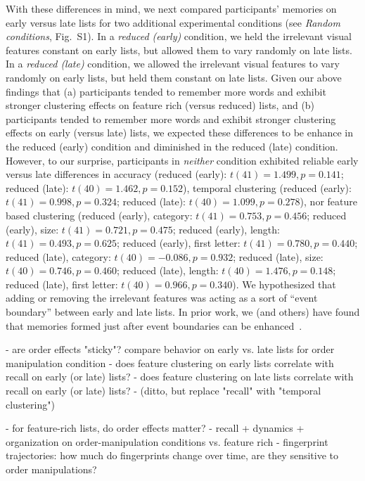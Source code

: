 \documentclass[11pt]{article}
\newcommand{\dynamicsRandom}{S1}
\begin{document}
With these differences in mind, we next compared participants' memories on
early versus late lists for two additional experimental conditions (see
\textit{Random conditions}, Fig.~\dynamicsRandom). In a \textit{reduced
(early)} condition, we held the irrelevant visual features constant on early
lists, but allowed them to vary randomly on late lists. In a \textit{reduced
(late)} condition, we allowed the irrelevant visual features to vary randomly
on early lists, but held them constant on late lists. Given our above findings
that (a) participants tended to remember more words and exhibit stronger
clustering effects on feature rich (versus reduced) lists, and (b) participants
tended to remember more words and exhibit stronger clustering effects on early
(versus late) lists, we expected these differences to be enhance in the reduced
(early) condition and diminished in the reduced (late) condition. However, to
our surprise, participants in \textit{neither} condition exhibited reliable
early versus late differences in accuracy (reduced (early): $t(41) = 1.499, p =
0.141$; reduced (late): $t(40) = 1.462, p = 0.152$), temporal clustering
(reduced (early): $t(41) = 0.998, p = 0.324$; reduced (late): $t(40) = 1.099, p
= 0.278$), nor feature based clustering (reduced (early), category: $t(41) =
0.753, p = 0.456$; reduced (early), size: $t(41) = 0.721, p = 0.475$; reduced
(early), length: $t(41) = 0.493, p = 0.625$; reduced (early), first letter:
$t(41) = 0.780, p = 0.440$; reduced (late), category: $t(40) = -0.086, p =
0.932$; reduced (late), size: $t(40) = 0.746, p = 0.460$; reduced (late),
length: $t(40) = 1.476, p = 0.148$; reduced (late), first letter: $t(40) =
0.966, p = 0.340$). We hypothesized that adding or removing the irrelevant
features was acting as a sort of ``event boundary'' between early and late
lists. In prior work, we (and others) have found that memories formed just
after event boundaries can be enhanced~\citep[e.g.,][]{MannEtal16}.




- are order effects "sticky"?  compare behavior on early vs. late lists for order manipulation condition
  - does feature clustering on early lists correlate with recall on early (or late) lists?
  - does feature clustering on late lists correlate with recall on early (or late) lists?
  - (ditto, but replace "recall" with "temporal clustering")


- for feature-rich lists, do order effects matter?
  - recall + dynamics + organization on order-manipulation conditions vs. feature rich
  - fingerprint trajectories: how much do fingerprints change over time, are they sensitive to order manipulations?
\end{document}
